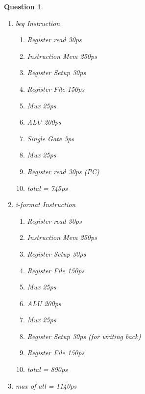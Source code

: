 \documentclass{article}
\theoremstyle{questionstyle}
\newtheorem{q}{Question}
\begin{document}
\begin{q}
\begin{enumerate}
\begin{enumerate}
        \item ALU 200ps
        \item Memory 250ps 
        \item total = 960ps
    \end{enumerate}
    \item beq Instruction \begin{enumerate}
        \item Register read 30ps
        \item Instruction Mem 250ps
        \item Register Setup 30ps
        \item Register File 150ps
        \item Mux 25ps
        \item ALU 200ps
        \item Single Gate 5ps
        \item Mux 25ps
        \item Register read 30ps (PC)
        \item total = 745ps
    \end{enumerate}
    \item i-format Instruction \begin{enumerate}
        \item Register read 30ps
        \item Instruction Mem 250ps
        \item Register Setup 30ps
        \item Register File 150ps
        \item Mux 25ps
        \item ALU 200ps
        \item Mux 25ps
        \item Register Setup 30ps (for writing back)
        \item Register File 150ps
        \item total = 890ps
    \end{enumerate}
    \item max of all = 1140ps
\end{enumerate}\end{q}
\end{document}
